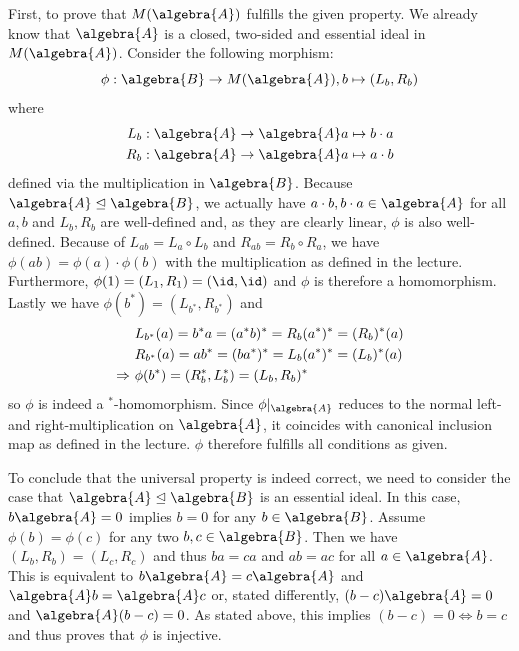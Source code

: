 \documentclass[a4paper]{article}
\begin{document}
First, to prove that $M(\algebra{A})$ fulfills the given property. We already know that $\algebra{A}$ is a closed, two-sided and essential ideal in $M(\algebra{A})$.
Consider the following morphism:
\begin{equation*}
    \phi: \algebra{B} \to M(\algebra{A}), b \mapsto (L_b, R_b) 
\end{equation*}
where
\begin{align*}
    L_b: \algebra{A} \to \algebra{A} &a \mapsto b \cdot a\\
    R_b: \algebra{A} \to \algebra{A} &a \mapsto a \cdot b
\end{align*}
defined via the multiplication in $\algebra{B}$.
Because $\algebra{A} \trianglelefteq \algebra{B}$, we actually have $a \cdot b, b \cdot a \in \algebra{A}$ for all $a,b$ and $L_b, R_b$ are well-defined and, as they are clearly linear, $\phi$ is also well-defined.
Because of $L_{ab} = L_{a} \circ L_{b}$ and $R_{ab} = R_b \circ R_a$, we have $\phi(ab) = \phi(a) \cdot \phi(b)$ with the multiplication as defined in the lecture.
Furthermore, $\phi(1) = (L_1, R_1) = (\id, \id)$ and $\phi$ is therefore a homomorphism.
Lastly we have $\phi(b^*) = (L_{b^*}, R_{b^*})$ and
\begin{align*}
    & L_{b^*}(a) = b^* a = (a^* b)^* = R_b(a^*)^* = (R_b)^*(a)\\
    & R_{b^*}(a) = a b^* = (b a^*)^* = L_b(a^*)^* = (L_b)^*(a) \\
    \then \ & \phi(b^*) = (R_b^*, L_b^*) = (L_b, R_b)^*
\end{align*}
so $\phi$ is indeed a $^*$-homomorphism.
Since $\phi|_\algebra{A}$ reduces to the normal left- and right-multiplication on $\algebra{A}$, it coincides with canonical inclusion map as defined in the lecture.
$\phi$ therefore fulfills all conditions as given.

To conclude that the universal property is indeed correct, we need to consider the case that $\algebra{A} \trianglelefteq \algebra{B}$ is an essential ideal. 
In this case, $b \algebra{A} = 0$ implies $b = 0$ for any $b \in \algebra{B}$.
Assume $\phi(b) = \phi(c)$ for any two $b, c \in \algebra{B}$. 
Then we have $(L_b, R_b) = (L_c, R_c)$ and thus $b a = c a$ and $a b = a c$ for all $a \in \algebra{A}$.
This is equivalent to $b \algebra{A} = c \algebra{A}$ and $\algebra{A} b = \algebra{A} c$ or, stated differently, $(b-c) \algebra{A} = 0$ and $\algebra{A} (b-c) = 0$.
As stated above, this implies $(b-c) = 0 \iff b = c$ and thus proves that $\phi$ is injective.
\end{document}
